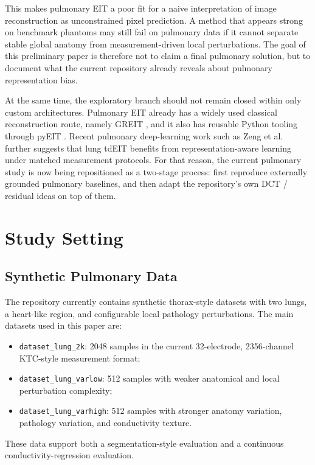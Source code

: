\documentclass[11pt,a4paper]{article}
\begin{document}
This makes pulmonary EIT a poor fit for a naive interpretation of image reconstruction as unconstrained pixel prediction. A method that appears strong on benchmark phantoms may still fail on pulmonary data if it cannot separate stable global anatomy from measurement-driven local perturbations. The goal of this preliminary paper is therefore not to claim a final pulmonary solution, but to document what the current repository already reveals about pulmonary representation bias.

At the same time, the exploratory branch should not remain closed within only custom architectures. Pulmonary EIT already has a widely used classical reconstruction route, namely GREIT \cite{adler2009greit}, and it also has reusable Python tooling through pyEIT \cite{liu2018pyeit}. Recent pulmonary deep-learning work such as Zeng et al. \cite{zeng2023lungdl} further suggests that lung tdEIT benefits from representation-aware learning under matched measurement protocols. For that reason, the current pulmonary study is now being repositioned as a two-stage process: first reproduce externally grounded pulmonary baselines, and then adapt the repository's own DCT / residual ideas on top of them.

\section{Study Setting}
\subsection{Synthetic Pulmonary Data}
The repository currently contains synthetic thorax-style datasets with two lungs, a heart-like region, and configurable local pathology perturbations. The main datasets used in this paper are:
\begin{itemize}[leftmargin=1.5em]
    \item \texttt{dataset\_lung\_2k}: 2048 samples in the current 32-electrode, 2356-channel KTC-style measurement format;
    \item \texttt{dataset\_lung\_varlow}: 512 samples with weaker anatomical and local perturbation complexity;
    \item \texttt{dataset\_lung\_varhigh}: 512 samples with stronger anatomy variation, pathology variation, and conductivity texture.
\end{itemize}

These data support both a segmentation-style evaluation and a continuous conductivity-regression evaluation.
\end{document}
